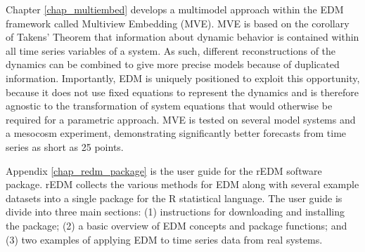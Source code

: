 Chapter \ref{chap_multiembed} develops a multimodel approach within the EDM framework called Multiview Embedding (MVE). MVE is based on the corollary of Takens' Theorem \cite{Takens_1981} that information about dynamic behavior is contained within all time series variables of a system. As such, different reconstructions of the dynamics can be combined to give more precise models because of duplicated information. Importantly, EDM is uniquely positioned to exploit this opportunity, because it does not use fixed equations to represent the dynamics and is therefore agnostic to the transformation of system equations that would otherwise be required for a parametric approach. MVE is tested on several model systems and a mesocosm experiment, demonstrating significantly better forecasts from time series as short as 25 points.

Appendix \ref{chap_redm_package} is the user guide for the rEDM software package. rEDM collects the various methods for EDM along with several example datasets into a single package for the R statistical language. The user guide is divide into three main sections: (1) instructions for downloading and installing the package; (2) a basic overview of EDM concepts and package functions; and (3) two examples of applying EDM to time series data from real systems. 